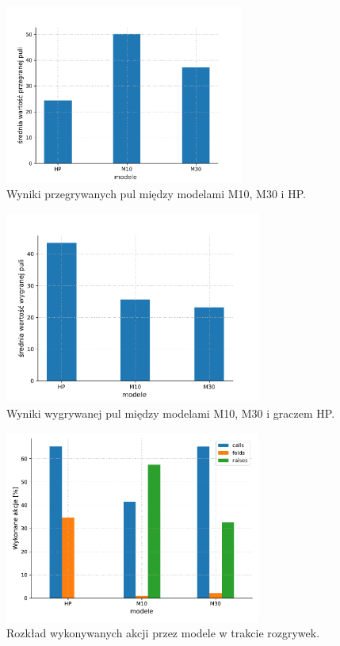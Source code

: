 \documentclass[12pt,oneside,a4paper]{report}
\begin{document}
\begin{figure}[!ht]
  \centering
  \includegraphics[width=0.7\textwidth]{./img/honest2.pdf}
  \caption{Wyniki przegrywanych pul między modelami M10, M30 i HP.}
\end{figure}

\begin{figure}[!ht]
  \centering
  \includegraphics[width=0.75\textwidth]{./img/honest3.pdf}
  \caption{Wyniki wygrywanej pul między modelami M10, M30 i graczem HP.}
\end{figure}


\begin{figure}[!ht]
  \centering
  \includegraphics[width=0.75\textwidth]{./img/honest4.pdf}
  \caption{Rozkład wykonywanych akcji przez modele w trakcie rozgrywek.}
\end{figure}
\end{document}
